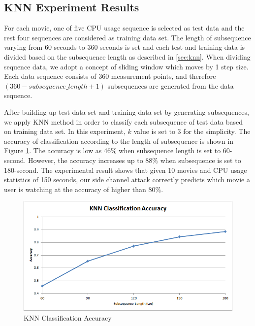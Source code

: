 \subsection{KNN Experiment Results}

For each movie, one of five CPU usage sequence is selected as test data and the rest four sequences are considered as training data set. 
The length of subsequence varying from 60 seconds to 360 seconds is set and each test and training data is divided based on the subsequence length as described in \ref{sec:knn}.
When dividing sequence data, we adopt a concept of sliding window which moves by 1 step size.
Each data sequence consists of $360$ measurement points, and therefore $(360 - subsequence\_length + 1)$ subsequences are generated from the data sequence. 

After building up test data set and training data set by generating subsequences, we apply KNN method in order to classify each subsequence of test data based on training data set. 
In this experiment, $k$ value is set to 3 for the simplicity.
The accuracy of classification according to the length of subsequence is shown in Figure \ref{fig:experiment_knn}.
The accuracy is low as 46$\%$ when subsequence length is set to 60-second.
However, the accuracy increases up to 88$\%$ when subsequence is set to 180-second.
The experimental result shows that given 10 movies and CPU usage statistics of 150 seconds, our side channel attack correctly predicts which movie a user is watching at the accuracy of higher than 80$\%$.

\begin{figure}[!h]
\centering
\includegraphics[scale=0.50]{Figures/experiment_knn}
\caption{KNN Classification Accuracy}
\label{fig:experiment_knn}
\vspace{-5mm}
\end{figure}
